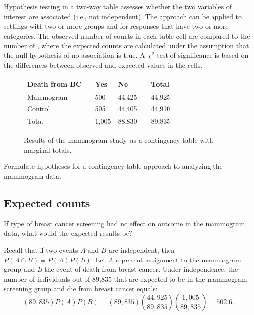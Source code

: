 Hypothesis testing in a two-way table assesses whether the two variables of interest are associated (i.e., not independent). The approach can be applied to settings with two or more groups and for responses that have two or more categories. The observed number of counts in each table cell are compared to the number of , where the expected counts are calculated under the assumption that the null hypothesis of no association is true. A $\chi^2$ test of significance is based on the differences between observed and expected values in the cells.

\begin{figure}[h]
	\centering
	\begin{tabular}{l| l l l l |l}
		\hline
		Death from BC & \hspace{1mm}  & Yes & No & \hspace{1mm} & Total \\
		\hline
		Mammogram				   &    & 500 & 44,425 & 				&44,925 \\
		Control				   &     & 505	& 44,405    &				& 44,910 \\
		\hline
		Total						   &    & 1,005 & 88,830 & 				& 89,835 \\
		\hline
	\end{tabular}
	\caption{Results of the mammogram study, as a contingency table with marginal totals.}
	\label{mammogramStudySummaryTableWithTotals}
\end{figure}

\begin{exercisewrap}
\begin{nexercise}
Formulate hypotheses for a contingency-table approach to analyzing the mammogram data.\footnotemark{}
\end{nexercise}
\end{exercisewrap}


\subsection{Expected counts}
\label{twoWayTablesExpectedCounts}

If type of breast cancer screening had no effect on outcome in the mammogram data, what would the expected results be?

Recall that if two events $A$ and $B$ are independent, then $P(A \cap B) = P(A)P(B)$. Let $A$ represent assignment to the mammogram group and $B$ the event of death from breast cancer. Under independence, the number of individuals out of 89,835 that are expected to be in the mammogram screening group and die from breast cancer equals:
\[(89,835) P(A)P(B) = (89,835) \left(\frac{44,925}{89,835}\right) \left(\frac{1,005}{89,835} \right) = 502.6. \]

